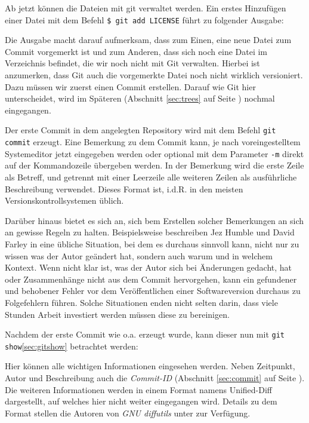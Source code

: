 Ab jetzt können die Dateien mit \gls{git} verwaltet werden. Ein erstes
Hinzufügen einer Datei mit dem Befehl \texttt{\$ git add LICENSE} führt zu
folgender Ausgabe:



Die Ausgabe macht darauf aufmerksam, dass zum Einen, eine neue Datei zum Commit
vorgemerkt ist und zum Anderen, dass sich noch eine Datei im Verzeichnis
befindet, die wir noch nicht mit Git verwalten. Hierbei ist anzumerken, dass
Git auch die vorgemerkte Datei noch nicht wirklich versioniert. Dazu müssen wir
zuerst einen Commit erstellen. Darauf wie Git hier unterscheidet, wird im
Späteren (Abschnitt \ref{sec:trees} auf Seite \pageref{sec:trees}) nochmal
eingegangen.

Der erste Commit in dem angelegten Repository wird mit dem Befehl \texttt{git
commit} erzeugt. Eine Bemerkung zu dem Commit kann, je nach voreingestelltem
Systemeditor jetzt eingegeben werden oder optional mit dem Parameter \texttt{-m}
direkt auf der Kommandozeile übergeben werden. In der Bemerkung wird die erste
Zeile als Betreff, und getrennt mit einer Leerzeile alle weiteren Zeilen als
ausführliche Beschreibung verwendet. Dieses Format ist, i.d.R. in den meisten
Versionskontrollsystemen üblich.

Darüber hinaus bietet es sich an, sich bem Erstellen solcher Bemerkungen an sich
an gewisse Regeln zu halten. Beispielsweise beschreiben Jez Humble und David
Farley in \cite[S.~37]{cd} eine übliche Situation, bei dem es durchaus sinnvoll
kann, nicht nur zu wissen was der Autor geändert hat, sondern auch warum
und in welchem Kontext. Wenn nicht klar ist, was der Autor sich bei
Änderungen gedacht, hat oder Zusammenhänge nicht aus dem Commit hervorgehen, kann
ein gefundener und behobener Fehler vor dem Veröffentlichen einer
Softwareversion durchaus zu Folgefehlern führen. Solche Situationen enden
nicht selten darin, dass viele Stunden Arbeit investiert werden müssen diese zu
bereinigen.\cite[S.~37]{cd}

Nachdem der erste Commit wie o.a. erzeugt wurde, kann dieser nun mit \texttt{git
show}\ref{sec:gitshow} betrachtet werden:



Hier können alle wichtigen Informationen eingesehen werden. Neben Zeitpunkt,
Autor und Beschreibung auch die \textit{Commit-ID} (Abschnitt \ref{sec:commit}
auf Seite \pageref{sec:commit}). Die weiteren Informationen werden in einem
Format namens Unified-Diff dargestellt, auf welches hier nicht weiter
eingegangen wird. Details zu dem Format stellen die Autoren von \textit{GNU
diffutils} unter \cite[S.~12-13]{paper:diffutils} zur Verfügung.

